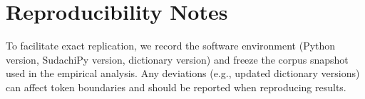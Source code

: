 \section{Reproducibility Notes}
\label{appendix:preprocess_reproducibility}

To facilitate exact replication, we record the software environment (Python version, SudachiPy version, dictionary version) and freeze the corpus snapshot used in the empirical analysis. Any deviations (e.g., updated dictionary versions) can affect token boundaries and should be reported when reproducing results.
